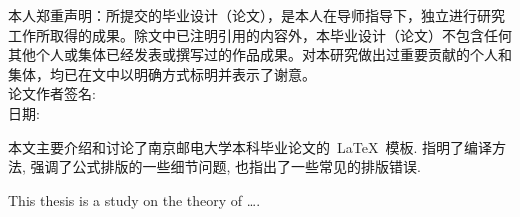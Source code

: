 {%

本人郑重声明：所提交的毕业设计（论文），是本人在导师指导下，独立进行研究工作所取得的成果。除文中已注明引用的内容外，本毕业设计（论文）不包含任何其他个人或集体已经发表或撰写过的作品成果。对本研究做出过重要贡献的个人和集体，均已在文中以明确方式标明并表示了谢意。\\



\hspace*{8cm}论文作者签名: \\
\hspace*{10cm}日期: }
\baselineskip=23pt  %




\begin{cnabstract}
\thispagestyle{empty}
本文主要介绍和讨论了南京邮电大学本科毕业论文的~\LaTeX~模板.
指明了编译方法, 强调了公式排版的一些细节问题, 也指出了一些常见的排版错误.



\end{cnabstract}
\par
\vspace*{2em}






\begin{enabstract}
\thispagestyle{empty}
This thesis is a study on the theory of \dots.

\end{enabstract}
\par
\vspace*{2em}

 \enkeywords{\LaTeX{};  }
